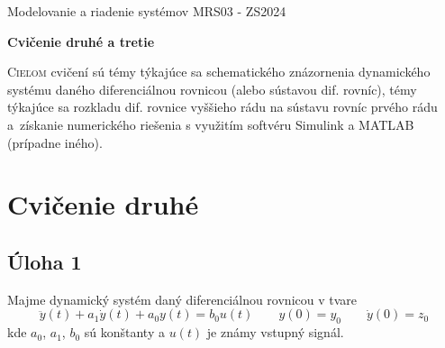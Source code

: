 \documentclass[a4paper, 10pt, ]{article}
\def\oznacenieCasti{MRS03 - ZS2024}
\begin{document}
\lstset{%
style=mystyle,
rangebeginprefix=\#\#\#\ cellB\ ,%
rangebeginsuffix=\ \#\#\#,%
rangeendprefix=\#\#\#\ cellE\ ,%
rangeendsuffix=\ \#\#\#,%
includerangemarker=false,
}






\fontsize{12pt}{22pt}\selectfont

\centerline{\textsf{Modelovanie a riadenie systémov} \hfill \textsf{\oznacenieCasti}}

\fontsize{18pt}{22pt}\selectfont





\begin{flushleft}
	\textbf{\textsf{Cvičenie druhé a tretie}}
\end{flushleft}






\normalsize

\bigskip

{\hypersetup{hidelinks}

\tableofcontents

}

\bigskip

\vspace{18pt}



\noindent
\lettrine[lines=3, nindent=0pt]{C}{ieľom} cvičení sú témy týkajúce sa schematického znázornenia dynamického systému daného diferenciálnou rovnicou (alebo sústavou dif. rovníc), témy týkajúce sa rozkladu dif. rovnice vyššieho rádu na sústavu rovníc prvého rádu a~získanie numerického riešenia s využitím softvéru Simulink a MATLAB (prípadne iného).














\section{Cvičenie druhé} 




\subsection{Úloha 1} \label{cv2u1}

Majme dynamický systém daný diferenciálnou rovnicou v tvare
\begin{equation} \label{eq:DR2R}
    \ddot y(t) + a_1 \dot y(t) + a_0 y(t) = b_0 u(t) \qquad y(0) = y_0 \qquad \dot y(0) = z_0
\end{equation}
kde $a_0$, $a_1$, $b_0$ sú konštanty a $u(t)$ je známy vstupný signál.
\end{document}
